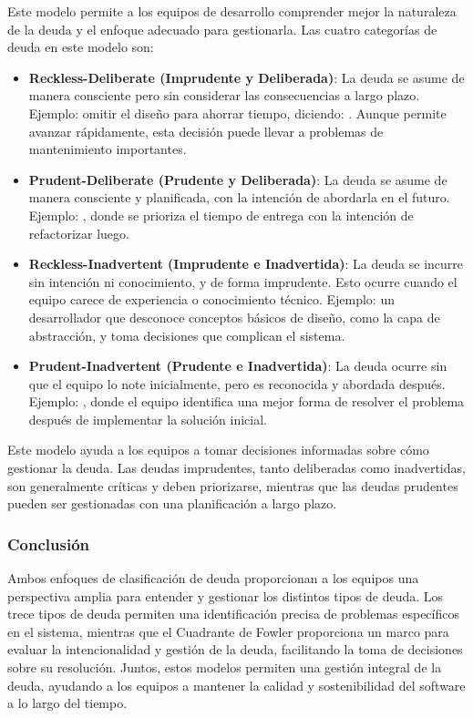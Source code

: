 Este modelo permite a los equipos de desarrollo comprender mejor la naturaleza de la \gls{deuda} y el enfoque adecuado para gestionarla. Las cuatro categorías de \gls{deuda} en este modelo son:
\begin{itemize}
    \item \textbf{Reckless-Deliberate (Imprudente y Deliberada)}: La \gls{deuda} se asume de manera consciente pero sin considerar las consecuencias a largo plazo. Ejemplo: omitir el diseño para ahorrar tiempo, diciendo: . Aunque permite avanzar rápidamente, esta decisión puede llevar a problemas de mantenimiento importantes.

    \item \textbf{Prudent-Deliberate (Prudente y Deliberada)}: La \gls{deuda} se asume de manera consciente y planificada, con la intención de abordarla en el futuro. Ejemplo: , donde se prioriza el tiempo de entrega con la intención de refactorizar luego.

    \item \textbf{Reckless-Inadvertent (Imprudente e Inadvertida)}: La \gls{deuda} se incurre sin intención ni conocimiento, y de forma imprudente. Esto ocurre cuando el equipo carece de experiencia o conocimiento técnico. Ejemplo: un desarrollador que desconoce conceptos básicos de diseño, como la capa de abstracción, y toma decisiones que complican el sistema.

    \item \textbf{Prudent-Inadvertent (Prudente e Inadvertida)}: La \gls{deuda} ocurre sin que el equipo lo note inicialmente, pero es reconocida y abordada después. Ejemplo: , donde el equipo identifica una mejor forma de resolver el problema después de implementar la solución inicial.
\end{itemize}

Este modelo ayuda a los equipos a tomar decisiones informadas sobre cómo gestionar la \gls{deuda}. Las deudas imprudentes, tanto deliberadas como inadvertidas, son generalmente críticas y deben priorizarse, mientras que las deudas prudentes pueden ser gestionadas con una planificación a largo plazo.

\subsubsection{Conclusión}

Ambos enfoques de clasificación de \gls{deuda} proporcionan a los equipos una perspectiva amplia para entender y gestionar los distintos tipos de deuda. Los trece tipos de \gls{deuda} permiten una identificación precisa de problemas específicos en el sistema, mientras que el Cuadrante de Fowler proporciona un marco para evaluar la intencionalidad y gestión de la deuda, facilitando la toma de decisiones sobre su resolución. Juntos, estos modelos permiten una gestión integral de la \gls{deuda}, ayudando a los equipos a mantener la calidad y sostenibilidad del software a lo largo del tiempo.

